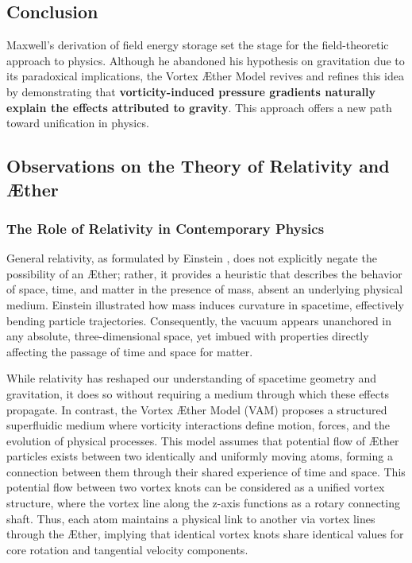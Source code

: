 \documentclass[a4paper,10pt]{article}
\begin{document}
\subsection*{Conclusion}
Maxwell's derivation of field energy storage set the stage for the field-theoretic approach to physics. Although he abandoned his hypothesis on gravitation due to its paradoxical implications, the Vortex Æther Model revives and refines this idea by demonstrating that \textbf{vorticity-induced pressure gradients naturally explain the effects attributed to gravity}. This approach offers a new path toward unification in physics.



\subsection{Observations on the Theory of Relativity and Æther}\label{subsec:observations-on-the-theory-of-relativity}
\subsubsection*{The Role of Relativity in Contemporary Physics}
General relativity, as formulated by Einstein \cite{einstein_1905_4}, does not explicitly negate the possibility of an Æther; rather, it provides a heuristic that describes the behavior of space, time, and matter in the presence of mass, absent an underlying physical medium.
Einstein illustrated how mass induces curvature in spacetime, effectively bending particle trajectories.
Consequently, the vacuum appears unanchored in any absolute, three-dimensional space, yet imbued with properties directly affecting the passage of time and space for matter.

While relativity has reshaped our understanding of spacetime geometry and gravitation, it does so without requiring a medium through which these effects propagate.
In contrast, the Vortex Æther Model (VAM) proposes a structured superfluidic medium where vorticity interactions define motion, forces, and the evolution of physical processes.
This model assumes that potential flow of Æther particles exists between two identically and uniformly moving atoms, forming a connection between them through their shared experience of time and space.
This potential flow between two vortex knots can be considered as a unified vortex structure, where the vortex line along the z-axis functions as a rotary connecting shaft.
Thus, each atom maintains a physical link to another via vortex lines through the Æther, implying that identical vortex knots share identical values for core rotation and tangential velocity components.
\end{document}
